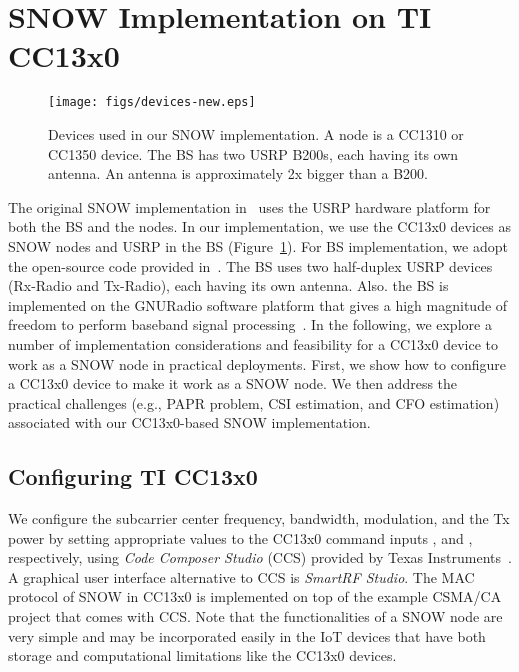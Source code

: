 \section{SNOW Implementation on TI CC13x0}\label{sec:implementation}
\begin{figure}[!htb]
\centering
\texttt{[image: figs/devices-new.eps]}
\caption{Devices used in our SNOW implementation. A node is a CC1310 or CC1350 device. The BS has two USRP B200s, each having its own antenna. An antenna is approximately 2x bigger than a B200.}
\label{fig:devices}
\end{figure}
The original SNOW implementation in~\cite{snow_ton} uses the USRP hardware platform for both the BS and the nodes. In our implementation, we use the CC13x0 devices as SNOW nodes and USRP in the BS (Figure~\ref{fig:devices}).
For BS implementation, we adopt the open-source code provided in~\cite{snow_bs}. The BS uses two half-duplex USRP devices (Rx-Radio and Tx-Radio), each having its own antenna. Also. the BS is implemented on the GNURadio software platform that gives a high magnitude of freedom to perform baseband signal processing~\cite{gnuradio}.
In the following, we explore a number of implementation considerations and feasibility for a CC13x0 device to work as a SNOW node in practical deployments. 
First, we show how to configure a CC13x0 device to make it work as a SNOW node. We then address the practical challenges (e.g., PAPR problem, CSI estimation, and CFO estimation) associated with our CC13x0-based SNOW implementation.

\subsection{Configuring TI CC13x0}
We configure the subcarrier center frequency, bandwidth, modulation, and the Tx power by setting appropriate values to the CC13x0 command inputs , and , respectively, using {\em Code Composer Studio} (CCS) provided by Texas Instruments~\cite{snow_cots}. A graphical user interface alternative to CCS is {\em SmartRF Studio}. The MAC protocol of SNOW in CC13x0 is implemented on top of the example CSMA/CA project that comes with CCS. Note that the functionalities of a SNOW node are very simple and may be incorporated easily in the IoT devices that have both storage and computational limitations like the CC13x0 devices.

